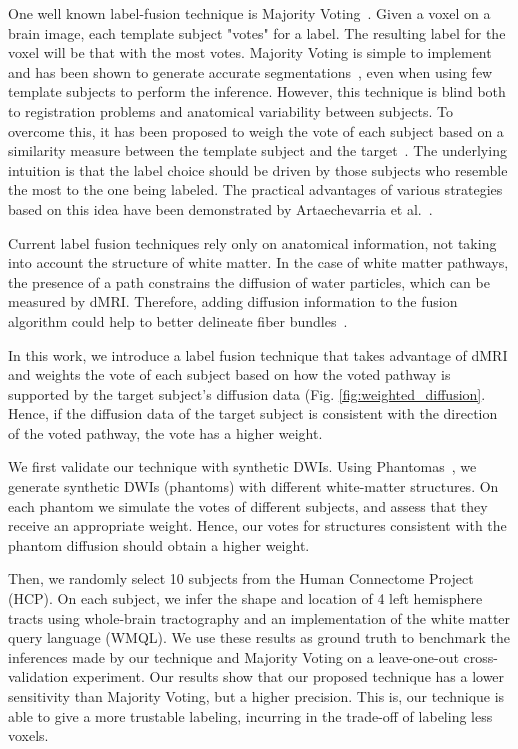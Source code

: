 One well known label-fusion technique is Majority Voting~\cite{Xu1992}. Given a
voxel on a brain image, each template subject "votes" for a label. The resulting
label for the voxel will be that with the most votes. Majority Voting is simple to
implement and has been shown to generate accurate segmentations~\cite{Asman2013},
even when using few template subjects to perform the inference. However,
this technique is blind both to registration problems and anatomical variability
between subjects. To overcome this, it has been proposed
to weigh the vote of each subject based on a similarity measure between the
template subject and the target~\cite{Sabuncu2010}. The underlying intuition is
that the label choice should be driven by those subjects who resemble the most
to the one being labeled. The practical advantages of various strategies based
on this idea have been demonstrated by Artaechevarria et al.~\cite{Artaechevarria2009}.

Current label fusion techniques rely only on anatomical information, not taking 
into account the structure of white matter. In the case of white matter pathways,
the presence of a path constrains the diffusion of water particles, which can be
measured by dMRI. Therefore, adding diffusion information to the fusion algorithm
could help to better delineate fiber bundles~\cite{Girard2017}.

In this work, we introduce a label fusion technique that takes advantage of dMRI
and weights the vote of each subject based on how the voted pathway is supported
by the target subject's diffusion data (Fig. \ref{fig:weighted_diffusion}. Hence,
if the diffusion data of the target subject is consistent with the direction of
the voted pathway, the vote has a higher weight.

We first validate our technique with synthetic DWIs. Using Phantomas~\cite{Caruyer2014},
we generate synthetic DWIs (phantoms) with different white-matter structures. On each phantom
we simulate the votes of different subjects, and assess that they receive an
appropriate weight. Hence, our votes for structures consistent with the
phantom diffusion should obtain a higher weight. 

Then, we randomly select 10 subjects from the Human Connectome Project (HCP).
On each subject, we infer the shape and location of 4 left hemisphere tracts
using whole-brain tractography and an implementation of
the white matter query language (WMQL). We use these results as ground truth to
benchmark the inferences made by our technique and Majority Voting on a leave-one-out
cross-validation experiment. Our results show that our proposed technique has a lower
sensitivity than Majority Voting, but a higher precision. This is, our technique
is able to give a more trustable labeling, incurring in the trade-off of labeling
less voxels.

